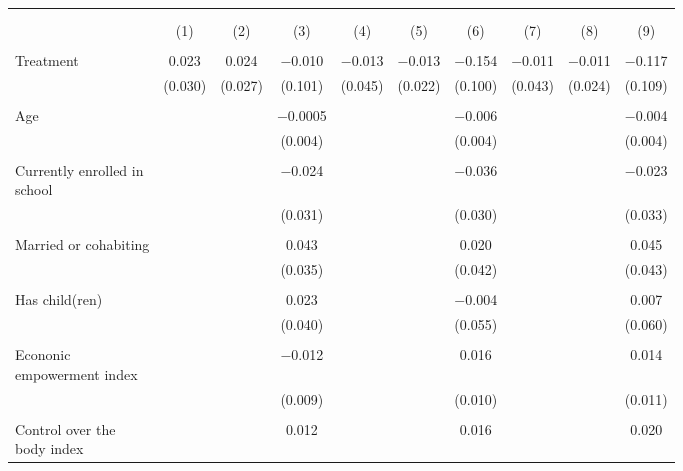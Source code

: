 
\begin{table}[!htbp] \centering 
  \caption{} 
  \label{} 
\begin{tabular}{@{\extracolsep{5pt}}lccccccccc} 
\\[-1.8ex]\hline 
\hline \\[-1.8ex] 
\\[-1.8ex] & (1) & (2) & (3) & (4) & (5) & (6) & (7) & (8) & (9)\\ 
\hline \\[-1.8ex] 
 Treatment & 0.023 & 0.024 & $-$0.010 & $-$0.013 & $-$0.013 & $-$0.154 & $-$0.011 & $-$0.011 & $-$0.117 \\ 
  & (0.030) & (0.027) & (0.101) & (0.045) & (0.022) & (0.100) & (0.043) & (0.024) & (0.109) \\ 
  & & & & & & & & & \\ 
 Age &  &  & $-$0.0005 &  &  & $-$0.006 &  &  & $-$0.004 \\ 
  &  &  & (0.004) &  &  & (0.004) &  &  & (0.004) \\ 
  & & & & & & & & & \\ 
 \makecell[l]{Currently enrolled in\\\hspace{1em}school} &  &  & $-$0.024 &  &  & $-$0.036 &  &  & $-$0.023 \\ 
  &  &  & (0.031) &  &  & (0.030) &  &  & (0.033) \\ 
  & & & & & & & & & \\ 
 Married or cohabiting &  &  & 0.043 &  &  & 0.020 &  &  & 0.045 \\ 
  &  &  & (0.035) &  &  & (0.042) &  &  & (0.043) \\ 
  & & & & & & & & & \\ 
 Has child(ren) &  &  & 0.023 &  &  & $-$0.004 &  &  & 0.007 \\ 
  &  &  & (0.040) &  &  & (0.055) &  &  & (0.060) \\ 
  & & & & & & & & & \\ 
 \makecell[l]{Econonic\\\hspace{1em}empowerment index} &  &  & $-$0.012 &  &  & 0.016 &  &  & 0.014 \\ 
  &  &  & (0.009) &  &  & (0.010) &  &  & (0.011) \\ 
  & & & & & & & & & \\ 
 \makecell[l]{Control over the\\\hspace{1em}body index} &  &  & 0.012 &  &  & 0.016 &  &  & 0.020 \\ 

\end{tabular}
\end{table}
